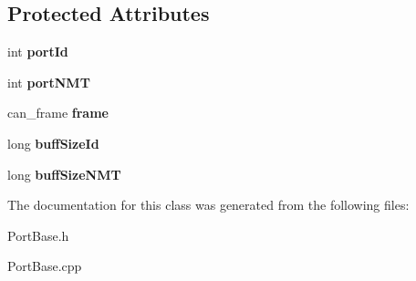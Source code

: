 \subsection*{Protected Attributes}
\begin{DoxyCompactItemize}
\item 
\mbox{\label{classPortBase_af8816a6f73bf391d2948f3564f8ea1df}} 
int {\bfseries port\+Id}
\item 
\mbox{\label{classPortBase_ae63f6df54bbeac1046b5dfbe178e1cee}} 
int {\bfseries port\+N\+MT}
\item 
\mbox{\label{classPortBase_ae175156fa18f3be1820adea89ef7b13c}} 
can\+\_\+frame {\bfseries frame}
\item 
\mbox{\label{classPortBase_a559431268076ea9b23bce545510f7b39}} 
long {\bfseries buff\+Size\+Id}
\item 
\mbox{\label{classPortBase_aba8241e5d55c06c7d1a11ebb18096328}} 
long {\bfseries buff\+Size\+N\+MT}
\end{DoxyCompactItemize}


The documentation for this class was generated from the following files\+:\begin{DoxyCompactItemize}
\item 
Port\+Base.\+h\item 
Port\+Base.\+cpp\end{DoxyCompactItemize}
